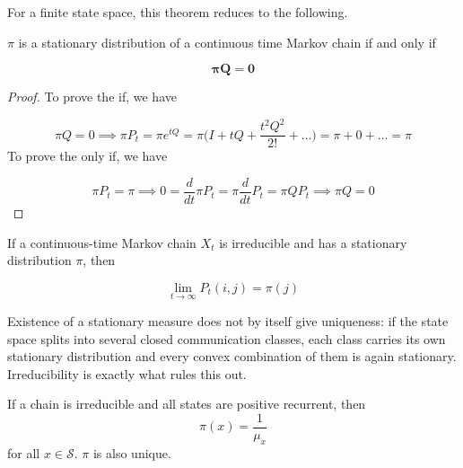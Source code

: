 	For a finite state space, this theorem reduces to the following. 

	\begin{corollary}
		\label{thm:generator-criterion-for-a-stationary}
		$\pi$ is a stationary distribution of a continuous time Markov chain if and only if 

			\begin{equation}
				\boldsymbol{\pi} \mathbf{Q} = \mathbf{0}
			\end{equation}
	\end{corollary}
	\begin{proof}
		To prove the if, we have 

			\begin{equation}
				\pi Q = 0 \implies \pi P_t= \pi e^{t Q} = \pi \bigg(I + t Q + \frac{t^2 Q^2}{2!} + \ldots \bigg) = \pi + 0 + \ldots = \pi
			\end{equation}
		To prove the only if, we have 

			\begin{equation}
				\pi P_t = \pi \implies 0 = \frac{d}{dt} \pi P_t = \pi \frac{d}{dt} P_t = \pi Q P_t \implies \pi Q = 0
			\end{equation}
	\end{proof}

	\begin{theorem}
		\label{thm:convergence-for-irreducible-continuous-time}
		If a continuous-time Markov chain $X_t$ is irreducible and has a stationary distribution $\pi$, then 

			\begin{equation}
				\lim_{t \rightarrow \infty} P_t (i, j) = \pi(j)
			\end{equation}
	\end{theorem}


	Existence of a stationary measure does not by itself give uniqueness: if the state space splits into several closed communication classes, each class carries its own stationary distribution and every convex combination of them is again stationary. Irreducibility is exactly what rules this out.

  \begin{theorem}
    \label{thm:stationary-distribution-and-positive-recurrence}

		If a chain is irreducible and all states are positive recurrent, then 
    \begin{equation}
      \pi(x) = \frac{1}{\mu_x}
    \end{equation}
    for all $x \in \mathcal{S}$. $\pi$ is also unique. 
  \end{theorem}

